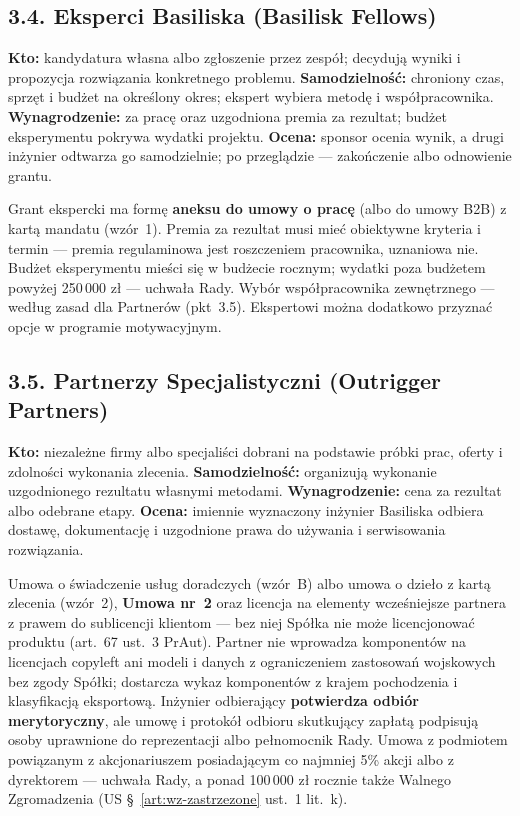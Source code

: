 \documentclass[11pt,a4paper]{report}
\newcommand{\US}[1]{US §~#1}
\begin{document}
\subsection*{3.4. Eksperci Basiliska (Basilisk Fellows)}
\textbf{Kto:} kandydatura własna albo zgłoszenie przez zespół; decydują wyniki i propozycja rozwiązania konkretnego problemu. \textbf{Samodzielność:} chroniony czas, sprzęt i budżet na określony okres; ekspert wybiera metodę i współpracownika. \textbf{Wynagrodzenie:} za pracę oraz uzgodniona premia za rezultat; budżet eksperymentu pokrywa wydatki projektu. \textbf{Ocena:} sponsor ocenia wynik, a drugi inżynier odtwarza go samodzielnie; po przeglądzie --- zakończenie albo odnowienie grantu.
\begin{Prawo}
Grant ekspercki ma formę \textbf{aneksu do umowy o pracę} (albo do umowy B2B) z kartą mandatu (wzór~1). Premia za rezultat musi mieć obiektywne kryteria i termin --- premia regulaminowa jest roszczeniem pracownika, uznaniowa nie. Budżet eksperymentu mieści się w budżecie rocznym; wydatki poza budżetem powyżej 250\,000 zł --- uchwała Rady. Wybór współpracownika zewnętrznego --- według zasad dla Partnerów (pkt~3.5). Ekspertowi można dodatkowo przyznać opcje w programie motywacyjnym.
\end{Prawo}

\subsection*{3.5. Partnerzy Specjalistyczni (Outrigger Partners)}
\textbf{Kto:} niezależne firmy albo specjaliści dobrani na podstawie próbki prac, oferty i zdolności wykonania zlecenia. \textbf{Samodzielność:} organizują wykonanie uzgodnionego rezultatu własnymi metodami. \textbf{Wynagrodzenie:} cena za rezultat albo odebrane etapy. \textbf{Ocena:} imiennie wyznaczony inżynier Basiliska odbiera dostawę, dokumentację i uzgodnione prawa do używania i serwisowania rozwiązania.
\begin{Prawo}
Umowa o świadczenie usług doradczych (wzór~B) albo umowa o dzieło z kartą zlecenia (wzór~2), \textbf{Umowa nr~2} oraz licencja na elementy wcześniejsze partnera z prawem do sublicencji klientom --- bez niej Spółka nie może licencjonować produktu (art.~67 ust.~3 PrAut). Partner nie wprowadza komponentów na licencjach copyleft ani modeli i danych z ograniczeniem zastosowań wojskowych bez zgody Spółki; dostarcza wykaz komponentów z krajem pochodzenia i klasyfikacją eksportową. Inżynier odbierający \textbf{potwierdza odbiór merytoryczny}, ale umowę i protokół odbioru skutkujący zapłatą podpisują osoby uprawnione do reprezentacji albo pełnomocnik Rady. Umowa z podmiotem powiązanym z akcjonariuszem posiadającym co najmniej 5\% akcji albo z dyrektorem --- uchwała Rady, a ponad 100\,000 zł rocznie także Walnego Zgromadzenia (\US{\ref{art:wz-zastrzezone} ust.~1 lit.~k}).
\end{Prawo}
\end{document}
